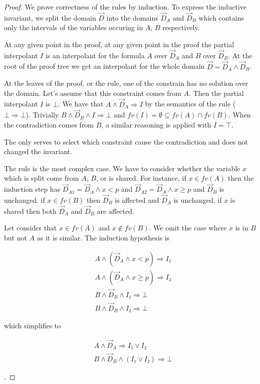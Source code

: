 \begin{proof}
We prove correctness of the rules by induction.
To express the inductive invariant, we split the domain $\vec D$ into the domains $\vec D_A$ and $\vec D_B$ which contains only the intervals of the variables occuring in $A$, $B$ respectively.

At any given point in the proof, at any given point in the proof the partial interpolant $I$ is an interpolant for the formula $A$ over $\vec D_A$ and $B$ over $\vec D_B$.
At the root of the proof tree we get an interpolant for the whole domain $\vec D = \vec D_A ∧ \vec D_B$.

At the leaves of the proof, or the \thLemI rule, one of the constrain has no solution over the domain.
Let's assume that this constraint comes from $A$.
Then the partial interpolant $I$ is $⊥$.
We have that $A ∧ \vec D_A ⇒ I$ by the semantics of the \thLem rule ($⊥⇒⊥$).
Trivially $B ∧ \vec D_B ∧ I ⇒ ⊥$ and $fv(I) = ∅ ⊆ fv(A) ∩ fv(B)$.
When the contradiction comes from $B$, a similar reasoning is applied with $I=⊤$.

The \weakenI only serves to select which constraint cause the contradiction and does not changed the invariant.

The \spltI rule is the most complex case.
We have to consider whether the variable $x$ which is split come from $A$, $B$, or is shared.
For instance, if $x\in fv(A)$ then the induction step has $\vec D_{A1} = \vec D_A ∧ x < p$ and $\vec D_{A2} = \vec D_A ∧ x ≥ p$ and $\vec D_B$ is unchanged.
if $x ∈ fv(B)$ then $\vec D_B$ is affected and $\vec D_A$ is unchanged.
if $x$ is shared then both $\vec D_A$ and $\vec D_B$ are affected.

Let consider that $x ∈ fv(A)$ and $x ∉ fv(B)$.
We omit the case where $x$ is in $B$ but not $A$ as it is similar.
The induction hypothesis is\\
\parbox{0.35\linewidth}{
\begin{eqnarray*}
& A ∧ (\vec D_A ∧ x < p) ⇒ I₁ \\
& A ∧ (\vec D_A ∧ x ≥ p) ⇒ I₂ \\
& B ∧ \vec D_B ∧ I₁ ⇒ ⊥ \\
& B ∧ \vec D_B ∧ I₂ ⇒ ⊥
\end{eqnarray*}
}
which simplifies to
\parbox{0.35\linewidth}{
\begin{eqnarray*}
& A ∧ \vec D_A ⇒ I₁ ∨ I₂ \\
& B ∧ \vec D_B ∧ (I₁ ∨ I₂) ⇒ ⊥
\end{eqnarray*}
}.


\end{proof}
